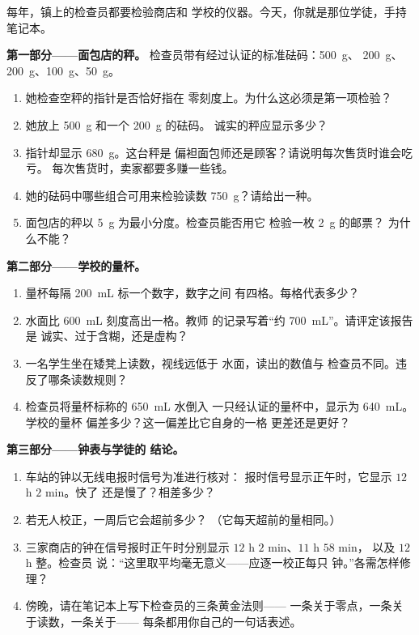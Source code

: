 \begin{problem}\label{pb:g6:measurement-in-science:1}
每年，镇上的检查员都要检验商店和
学校的仪器。今天，你就是那位学徒，手持笔记本。

\medskip\noindent\textbf{第一部分——面包店的秤。}
检查员带有经过认证的标准砝码：\qty{500}{g}、
\qty{200}{g}、\qty{200}{g}、\qty{100}{g}、\qty{50}{g}。
\begin{enumerate}
  \item 她检查空秤的指针是否恰好指在
        零刻度上。为什么这必须是第一项检验？
  \item 她放上 \qty{500}{g} 和一个 \qty{200}{g} 的砝码。
        诚实的秤应显示多少？
  \item 指针却显示 \qty{680}{g}。这台秤是
        偏袒面包师还是顾客？请说明每次售货时谁会吃亏。
        每次售货时，卖家都要多赚一些钱。
  \item 她的砝码中哪些组合可用来检验读数
        \qty{750}{g}？请给出一种。
  \item 面包店的秤以 \qty{5}{g} 为最小分度。检查员能否用它
        检验一枚 \qty{2}{g} 的邮票？
        为什么不能？
\end{enumerate}

\medskip\noindent\textbf{第二部分——学校的量杯。}
\begin{enumerate}[resume]
  \item 量杯每隔 \qty{200}{mL} 标一个数字，数字之间
        有四格。每格代表多少？
  \item 水面比 \qty{600}{mL} 刻度高出一格。教师
        的记录写着“约 \qty{700}{mL}”。请评定该报告是
        诚实、过于含糊，还是虚构？
  \item 一名学生坐在矮凳上读数，视线远低于
        水面，读出的数值与
        检查员不同。违反了哪条读数规则？
  \item 检查员将量杯标称的 \qty{650}{mL} 水倒入
        一只经认证的量杯中，显示为 \qty{640}{mL}。学校的量杯
        偏差多少？这一偏差比它自身的一格
        更差还是更好？
\end{enumerate}

\medskip\noindent\textbf{第三部分——钟表与学徒的
结论。}
\begin{enumerate}[resume]
  \item 车站的钟以无线电报时信号为准进行核对：
        报时信号显示正午时，它显示 $12$ h $2$ min。快了
        还是慢了？相差多少？
  \item 若无人校正，一周后它会超前多少？
        （它每天超前的量相同。）
  \item 三家商店的钟在信号报时正午时分别显示 $12$ h $2$ min、$11$ h $58$ min，
        以及 $12$ h 整。检查员
        说：“这里取平均毫无意义——应逐一校正每只
        钟。”各需怎样修理？
  \item 傍晚，请在笔记本上写下检查员的三条黄金法则——
        一条关于零点，一条关于读数，一条关于——
        每条都用你自己的一句话表述。
\end{enumerate}
\end{problem}
